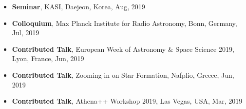 \documentclass[11pt,letterpaper,roman]{moderncv}        %
\begin{document}
\begin{itemize}
\item \textbf{Seminar},
  KASI, Daejeon, Korea, Aug, 2019 %
\item \textbf{Colloquium},
  Max Planck Institute for Radio Astronomy, Bonn, Germany, Jul, 2019 %
\item \textbf{Contributed Talk},
  European Week of Astronomy \& Space Science 2019, Lyon, France, Jun, 2019 %
\item \textbf{Contributed Talk},
  Zooming in on Star Formation, Nafplio, Greece, Jun, 2019 %
\item \textbf{Contributed Talk},
  Athena++ Workshop 2019, Las Vegas, USA, Mar, 2019 %

\end{itemize}
\end{document}
